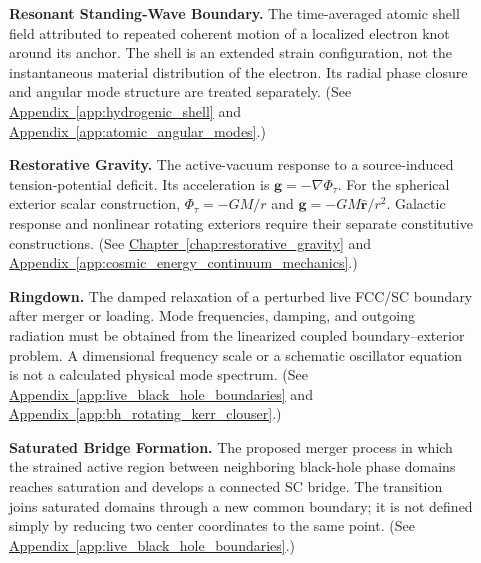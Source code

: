\begin{description}
\item[] \begin{minipage}[t]{\linewidth}
\textbf{Resonant Standing-Wave Boundary.} The time-averaged atomic shell field attributed to repeated coherent motion of a localized electron knot around its anchor. The shell is an extended strain configuration, not the instantaneous material distribution of the electron. Its radial phase closure and angular mode structure are treated separately.
(See \hyperref[app:hydrogenic_shell]{Appendix~\ref*{app:hydrogenic_shell}} and \hyperref[app:atomic_angular_modes]{Appendix~\ref*{app:atomic_angular_modes}}.)
\end{minipage}

\item[] \begin{minipage}[t]{\linewidth}
\textbf{Restorative Gravity.} The active-vacuum response to a source-induced tension-potential deficit. Its acceleration is $\mathbf g=-\nabla\Phi_\tau$. For the spherical exterior scalar construction, $\Phi_\tau=-GM/r$ and $\mathbf g=-GM\hat{\mathbf r}/r^2$. Galactic response and nonlinear rotating exteriors require their separate constitutive constructions.
(See \hyperref[chap:restorative_gravity]{Chapter~\ref*{chap:restorative_gravity}} and \hyperref[app:cosmic_energy_continuum_mechanics]{Appendix~\ref*{app:cosmic_energy_continuum_mechanics}}.)
\end{minipage}

\item[] \begin{minipage}[t]{\linewidth}
\textbf{Ringdown.} The damped relaxation of a perturbed live FCC/SC boundary after merger or loading. Mode frequencies, damping, and outgoing radiation must be obtained from the linearized coupled boundary--exterior problem. A dimensional frequency scale or a schematic oscillator equation is not a calculated physical mode spectrum.
(See \hyperref[app:live_black_hole_boundaries]{Appendix~\ref*{app:live_black_hole_boundaries}} and \hyperref[app:bh_rotating_kerr_clouser]{Appendix~\ref*{app:bh_rotating_kerr_clouser}}.)
\end{minipage}

\item[] \begin{minipage}[t]{\linewidth}
\textbf{Saturated Bridge Formation.} The proposed merger process in which the strained active region between neighboring black-hole phase domains reaches saturation and develops a connected SC bridge. The transition joins saturated domains through a new common boundary; it is not defined simply by reducing two center coordinates to the same point.
(See \hyperref[app:live_black_hole_boundaries]{Appendix~\ref*{app:live_black_hole_boundaries}}.)
\end{minipage}


\end{description}
